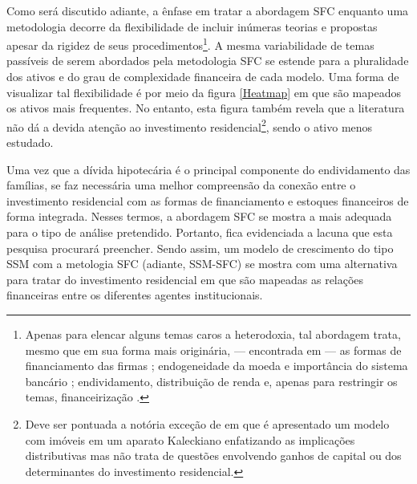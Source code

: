 Como será discutido adiante, a ênfase em tratar a abordagem SFC enquanto uma metodologia decorre da flexibilidade de incluir inúmeras teorias e propostas apesar da rigidez de seus procedimentos\footnote{Apenas para elencar alguns temas caros a heterodoxia, tal abordagem trata, mesmo que em sua forma mais originária, --- encontrada em \textcite{godley_macroeconomics_1983} --- as formas de financiamento das firmas \cites{asimakopulos_kalecki_1983}{skott_finance_1988}{messori_financing_1991}; endogeneidade da moeda e importância do sistema bancário \cites{messori_financing_1991}{dow_horizontalism:_1996}{arestis_theoretical_1996}{godley_money_1999}; endividamento, distribuição de renda e, apenas para restringir os temas, financeirização \cites{palley_inside_1996}{wolfson_irving_1996}{palley_money_1997}{palley_financial_2002}{dos_santos_revisiting_2009}{palley_inside_2010}{hein_finance-dominated_2012}.}. 
A mesma variabilidade de temas passíveis de serem abordados pela metodologia SFC se estende para a pluralidade dos ativos e do grau de complexidade financeira de cada modelo. Uma forma de visualizar tal flexibilidade é por meio da figura \ref{Heatmap} em que são mapeados os ativos mais frequentes. No entanto, esta figura também revela que a literatura não dá a devida atenção ao investimento residencial\footnote{Deve ser pontuada a notória exceção de \textcite{zezza_u.s._2008} em que é apresentado um modelo com imóveis em um aparato Kaleckiano enfatizando as implicações distributivas mas não trata de questões envolvendo ganhos de capital ou dos determinantes do investimento residencial.}, sendo o ativo menos estudado. 


Uma vez que a dívida hipotecária é o principal componente do endividamento das famílias, se faz necessária uma melhor compreensão da conexão entre o investimento residencial com as formas de financiamento e estoques financeiros de forma integrada.
Nesses termos, a abordagem SFC se mostra a mais adequada para o tipo de análise pretendido. Portanto, fica evidenciada a lacuna que esta pesquisa procurará preencher.
Sendo assim, um modelo de crescimento do tipo SSM com a metologia SFC (adiante, SSM-SFC) se mostra com uma alternativa para tratar do investimento residencial em que são mapeadas as relações financeiras entre os diferentes agentes institucionais.

